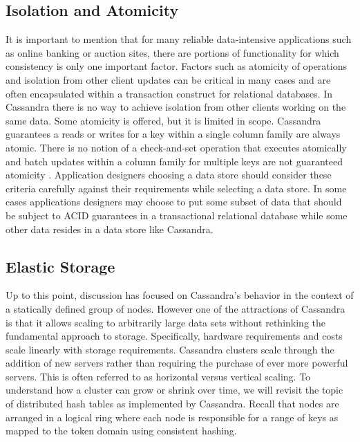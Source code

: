 \documentclass[twocolumn]{article}
\begin{document}
\subsection{Isolation and Atomicity}\label{s:isolation}

It is important to mention that for many reliable data-intensive applications such as online banking or auction sites, there are portions of functionality for which consistency is only one important factor.  Factors such as atomicity of operations and isolation from other client updates can be critical in many cases and are often encapsulated within a transaction construct for relational databases.  In Cassandra there is no way to achieve isolation from other clients working on the same data.  Some atomicity is offered, but it is limited in scope.  Cassandra guarantees a reads or writes for a key within a single column family are always atomic.  There is no notion of a check-and-set operation that executes atomically and batch updates within a column family for multiple keys are not guaranteed atomicity \cite{ref:cwiki}.  Application designers choosing a data store should consider these criteria carefully against their requirements while selecting a data store.  In some cases applications designers may choose to put some subset of data that should be subject to ACID guarantees in a transactional relational database while some other data resides in a data store like Cassandra.

\newpage
\subsection{Elastic Storage}\label{s:elasticity}

Up to this point, discussion has focused on Cassandra's behavior in the context of a statically defined group of nodes.  However one of the attractions of Cassandra is that it allows scaling to arbitrarily large data sets without rethinking the fundamental approach to storage.  Specifically, hardware requirements and costs scale linearly with storage requirements.  Cassandra clusters scale through the addition of new servers rather than requiring the purchase of ever more powerful servers.  This is often referred to as horizontal versus vertical scaling.  To understand how a cluster can grow or shrink over time, we will revisit the topic of distributed hash tables as implemented by Cassandra.  Recall that nodes are arranged in a logical ring where each node is responsible for a range of keys as mapped to the token domain using consistent hashing.
\end{document}
